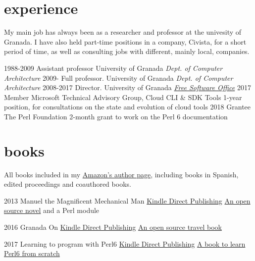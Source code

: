 \documentclass[]{friggeri-jj-cv}
\begin{document}
\section{experience}

My main job has always been as a researcher and professor at the
univesity of Granada. I have also held part-time positions in a
company, Civista, for a short period of time, as well as consulting
jobs with different, mainly local, companies.

\begin{entrylist}
  \entry
    {1988-2009}
    {Assistant professor}
    {University of Granada}
    {\emph{Dept. of Computer Architecture}}
  \entry
    {2009-}
    {Full professor.}
    {University of Granada}
    {\emph{Dept. of Computer Architecture}}
    \entry
    {2008-2017}
    {Director.}
    {University of Granada}
    {\href{http://osl.ugr.es}{\emph{Free Software Office}}}
    \entry
    {2017}
    {Member}
    {Microsoft Technical Advisory Group, Cloud CLI \& SDK Tools}
    {1-year position, for consultations on the state and evolution of
      cloud tools}
    \entry
    {2018}
    {Grantee}
    {The Perl Foundation}
    {2-month grant to work on the Perl 6 documentation}
\end{entrylist}

\section{books}

All books included in my
\href{https://amazon.com/author/jjmerelo}{Amazon's author page},
including books in Spanish, edited proceedings and coauthored books.

\begin{entrylist}
  \entry
    {2013}
    {Manuel the Magnificent Mechanical Man}
    {\href{http://www.amazon.com/dp/B00ED084BK/}{Kindle Direct Publishing}}
    {\href{http://jj.github.io/hoborg}{An open source novel} and a
      Perl module}
  \end{entrylist}
  
  \begin{entrylist}
  \entry
    {2016}
    {Granada On}
    {\href{https://www.amazon.com/Granada-Beaten-Track-explorations-Andalusia/dp/1523257083}{Kindle Direct Publishing}}
    {\href{http://github.com/JJ/granada-off}{An open source travel book}}
  \end{entrylist}

  \begin{entrylist}
  \entry
    {2017}
    {Learning to program with Perl6}
    {\href{https://www.amazon.com/Learning-program-Perl-Getting-programming/dp/1521795789/ref=sr_1_1?ie=UTF8&qid=1518685809&sr=8-1}{Kindle Direct Publishing}}
    {\href{http://github.com/JJ/perl6em}{A book to learn Perl6 from scratch}}
  \end{entrylist}
\end{document}
